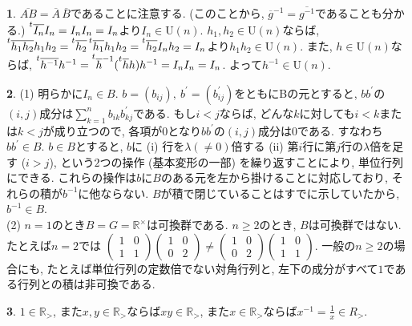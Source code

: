 \documentclass{amsart}
\theoremstyle{definition}
\newtheorem{ans}{}
\numberwithin{ans}{subsection}
\newcommand{\transpose}[1]{{\prescript{t}{}{#1}}}
\newcommand{\U}[1]{\mathrm{U}(#1)}
\begin{document}
\begin{ans}
  $\overline{AB} = \overline{A}\,\overline{B}$であることに注意する.
  (このことから, $\overline{g}^{-1} = \overline{g^{-1}}$であることも分かる.)
  $\transpose{\overline{I_n}I_n} = I_nI_n = I_n$より$I_n \in \U{n}$.
  $h_1, h_2 \in \U{n}$ならば,
  $\transpose{\overline{h_1h_2}}h_1h_2
  = \transpose{\overline{h_2}}\,\transpose{\overline{h_1}}h_1h_2
  = \transpose{\overline{h_2}}I_nh_2 = I_n$より$h_1h_2 \in \U{n}$.
  また, $h \in \U{n}$ならば,
  $\transpose{\overline{h^{-1}}}h^{-1}
  = \transpose{\overline{h}^{-1}}(\transpose{\overline{h}}h)h^{-1}
  = I_nI_n = I_n$.
  よって$h^{-1} \in \U{n}$.
\end{ans}

\begin{ans}
  (1) 明らかに$I_n \in B$.
  $b = (b_{ij}),\ b^\prime = (b^\prime_{ij})$をともにBの元とすると,
  $bb^\prime$の$(i, j)$成分は$\sum_{k = 1}^nb_{ik}b^\prime_{kj}$である.
  もし$i < j$ならば, どんな$k$に対しても$i < k$または$k < j$が成り立つので,
  各項が$0$となり$bb^\prime$の$(i, j)$成分は$0$である. すなわち$bb^\prime \in B$.
  $b \in B$とすると, $b$に
  (i) 行を$\lambda (\neq 0)$倍する
  (ii) 第$i$行に第$j$行の$\lambda$倍を足す ($i > j$),
  という$2$つの操作 (基本変形の一部) を繰り返すことにより, 単位行列にできる.
  これらの操作は$b$に$B$のある元を左から掛けることに対応しており, それらの積が$b^{-1}$に他ならない.
  $B$が積で閉じていることはすでに示していたから, $b^{-1} \in B$.\\
  (2) $n = 1$のとき$B = G = \mathbb{R}^\times$は可換群である.
  $n \ge 2$のとき, $B$は可換群ではない. たとえば$n = 2$では
  $\begin{pmatrix}
    1 & 0 \\
    1 & 1
  \end{pmatrix}\begin{pmatrix}
    1 & 0 \\
    0 & 2
  \end{pmatrix} \neq \begin{pmatrix}
    1 & 0 \\
    0 & 2
  \end{pmatrix}\begin{pmatrix}
    1 & 0 \\
    1 & 1
  \end{pmatrix}$.
  一般の$n \ge 2$の場合にも, たとえば単位行列の定数倍でない対角行列と,
  左下の成分がすべて$1$である行列との積は非可換である.
\end{ans}

\begin{ans}
  $1 \in \mathbb{R}_>$,
  また$x, y \in \mathbb{R}_>$ならば$xy \in \mathbb{R}_>$,
  また$x \in \mathbb{R}_>$ならば$x^{-1} = \frac{1}{x} \in {R}_>$.
\end{ans}
\end{document}
